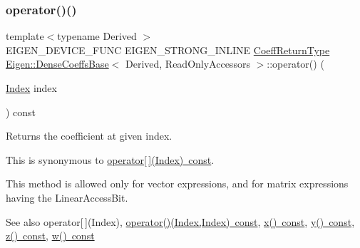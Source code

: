 \subsubsection{\texorpdfstring{operator()()}{operator()()}\hspace{0.1cm}{\footnotesize\ttfamily [2/2]}}
{\footnotesize\ttfamily template$<$typename Derived $>$ \\
E\+I\+G\+E\+N\+\_\+\+D\+E\+V\+I\+C\+E\+\_\+\+F\+U\+NC E\+I\+G\+E\+N\+\_\+\+S\+T\+R\+O\+N\+G\+\_\+\+I\+N\+L\+I\+NE \mbox{\hyperlink{struct_eigen_1_1internal_1_1true__type}{Coeff\+Return\+Type}} \mbox{\hyperlink{class_eigen_1_1_dense_coeffs_base}{Eigen\+::\+Dense\+Coeffs\+Base}}$<$ Derived, Read\+Only\+Accessors $>$\+::operator() (\begin{DoxyParamCaption}\item[{\mbox{\hyperlink{struct_eigen_1_1_eigen_base_a554f30542cc2316add4b1ea0a492ff02}{Index}}}]{index }\end{DoxyParamCaption}) const\hspace{0.3cm}{\ttfamily [inline]}}

\begin{DoxyReturn}{Returns}
the coefficient at given index.
\end{DoxyReturn}
This is synonymous to \mbox{\hyperlink{class_eigen_1_1_dense_coeffs_base_3_01_derived_00_01_read_only_accessors_01_4_ad26422dfa7b2bf859d4304663c36de10}{operator\mbox{[}$\,$\mbox{]}(\+Index) const}}.

This method is allowed only for vector expressions, and for matrix expressions having the Linear\+Access\+Bit.

\begin{DoxySeeAlso}{See also}
operator\mbox{[}$\,$\mbox{]}(\+Index), \mbox{\hyperlink{class_eigen_1_1_dense_coeffs_base_3_01_derived_00_01_read_only_accessors_01_4_a29ac34389e098ec963ebb2ebd351335a}{operator()(\+Index,\+Index) const}}, \mbox{\hyperlink{class_eigen_1_1_dense_coeffs_base_3_01_derived_00_01_read_only_accessors_01_4_a36fb246141b6ea5ab5289d7eb6afdf6e}{x() const}}, \mbox{\hyperlink{class_eigen_1_1_dense_coeffs_base_3_01_derived_00_01_read_only_accessors_01_4_af2cb257225cf4348136a37fa9333ccda}{y() const}}, \mbox{\hyperlink{class_eigen_1_1_dense_coeffs_base_3_01_derived_00_01_read_only_accessors_01_4_a9040af2dcad8961168daafe09c1b1dc4}{z() const}}, \mbox{\hyperlink{class_eigen_1_1_dense_coeffs_base_3_01_derived_00_01_read_only_accessors_01_4_a422892fbb6b2eecce243776c3b8452ab}{w() const}} 
\end{DoxySeeAlso}
\mbox{\label{class_eigen_1_1_dense_coeffs_base_3_01_derived_00_01_read_only_accessors_01_4_ad26422dfa7b2bf859d4304663c36de10}} 
